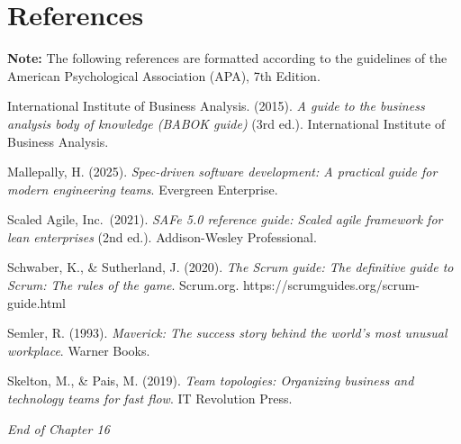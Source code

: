 \documentclass[
  11pt,
  openany,
  oneside]{book}
\begin{document}
\section{References}\label{references}

\textbf{Note:} The following references are formatted according to the
guidelines of the American Psychological Association (APA), 7th Edition.

International Institute of Business Analysis. (2015). \emph{A guide to
the business analysis body of knowledge (BABOK guide)} (3rd ed.).
International Institute of Business Analysis.

Mallepally, H. (2025). \emph{Spec-driven software development: A
practical guide for modern engineering teams}. Evergreen Enterprise.

Scaled Agile, Inc.~(2021). \emph{SAFe 5.0 reference guide: Scaled agile
framework for lean enterprises} (2nd ed.). Addison-Wesley Professional.

Schwaber, K., \& Sutherland, J. (2020). \emph{The Scrum guide: The
definitive guide to Scrum: The rules of the game}. Scrum.org.
https://scrumguides.org/scrum-guide.html

Semler, R. (1993). \emph{Maverick: The success story behind the world's
most unusual workplace}. Warner Books.

Skelton, M., \& Pais, M. (2019). \emph{Team topologies: Organizing
business and technology teams for fast flow}. IT Revolution Press.

\bigskip

\emph{End of Chapter 16}

\backmatter
\end{document}
